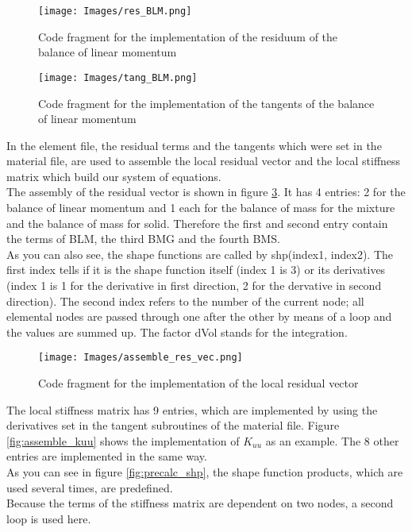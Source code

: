 \documentclass[12pt]{article}
\begin{document}
\begin{figure}[H]
	\centering
	\texttt{[image: Images/res\_BLM.png]}
	\caption{Code fragment for the implementation of the residuum of the balance of linear momentum}
	\label{fig:res_BLM}
\end{figure}

\begin{figure}[H]
	\centering
	\texttt{[image: Images/tang\_BLM.png]}
	\caption{Code fragment for the implementation of the tangents of the balance of linear momentum}
	\label{fig:tang_BLM}
\end{figure}

In the element file, the residual terms and the tangents which were set in the material file, are used to assemble the local residual vector and the local stiffness matrix which build our system of equations. \\
The assembly of the residual vector is shown in figure \ref{fig:assemble_res_vec}. It has 4 entries: 2 for the balance of linear momentum and 1 each for the balance of mass for the mixture and the balance of mass for solid. Therefore the first and second entry contain the terms of BLM, the third BMG and the fourth BMS. \\
As you can also see, the shape functions are called by shp(index1, index2). The first index tells if it is the shape function itself (index 1 is 3) or its derivatives (index 1 is 1 for the derivative in first direction, 2 for the dervative in second direction). The second index refers to the number of the current node; all elemental nodes are passed through one after the other by means of a loop and the values are summed up. The factor dVol stands for the integration. \\

\begin{figure}[H]

	\centering
	\texttt{[image: Images/assemble\_res\_vec.png]}
	\caption{Code fragment for the implementation of the local residual vector}
		\label{fig:assemble_res_vec}
\end{figure}

The local stiffness matrix has 9 entries, which are implemented by using the derivatives set in the tangent subroutines of the material file. Figure \ref{fig:assemble_kuu} shows the implementation of $K_{uu}$ as an example. The 8 other entries are implemented in the same way. \\
As you can see in figure \ref{fig:precalc_shp}, the shape function products, which are used several times, are predefined. \\
Because the terms of the stiffness matrix are dependent on two nodes, a second loop is used here. \\
\end{document}
